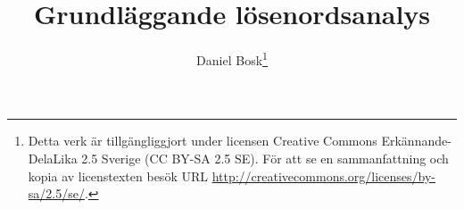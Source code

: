 \documentclass[a4paper]{article}
\title{Grundläggande lösenordsanalys}
\author{Daniel Bosk\footnote{%
    Detta verk är tillgängliggjort under licensen Creative Commons 
    Erkännande-DelaLika 2.5 Sverige (CC BY-SA 2.5 SE).
    För att se en sammanfattning och kopia av licenstexten besök URL 
    \url{http://creativecommons.org/licenses/by-sa/2.5/se/}.
  }
}
\theoremstyle{definition}
\theoremstyle{remark}
\begin{document}
\maketitle
\tableofcontents



\printbibliography{}
\end{document}
